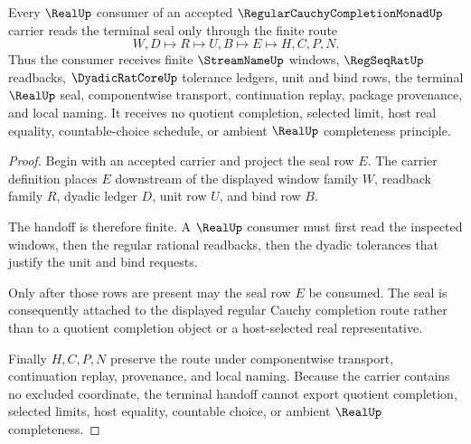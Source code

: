 \begin{theorem}
\label{thm:regular-cauchy-completion-monad-real-seal-handoff}
Every $\RealUp$ consumer of an accepted $\RegularCauchyCompletionMonadUp$ carrier reads the terminal seal only through the finite route
$$
W,D \longmapsto R \longmapsto U,B \longmapsto E \longmapsto H,C,P,N .
$$
Thus the consumer receives finite $\StreamNameUp$ windows, $\RegSeqRatUp$ readbacks, $\DyadicRatCoreUp$ tolerance ledgers, unit and bind rows, the terminal $\RealUp$ seal, componentwise transport, continuation replay, package provenance, and local naming. It receives no quotient completion, selected limit, host real equality, countable-choice schedule, or ambient $\RealUp$ completeness principle.
\end{theorem}
\begin{proof}
Begin with an accepted carrier and project the seal row $E$. The carrier definition places $E$ downstream of the displayed window family $W$, readback family $R$, dyadic ledger $D$, unit row $U$, and bind row $B$.

The handoff is therefore finite. A $\RealUp$ consumer must first read the inspected windows, then the regular rational readbacks, then the dyadic tolerances that justify the unit and bind requests.

Only after those rows are present may the seal row $E$ be consumed. The seal is consequently attached to the displayed regular Cauchy completion route rather than to a quotient completion object or a host-selected real representative.

Finally $H,C,P,N$ preserve the route under componentwise transport, continuation replay, provenance, and local naming. Because the carrier contains no excluded coordinate, the terminal handoff cannot export quotient completion, selected limits, host equality, countable choice, or ambient $\RealUp$ completeness.
\end{proof}

